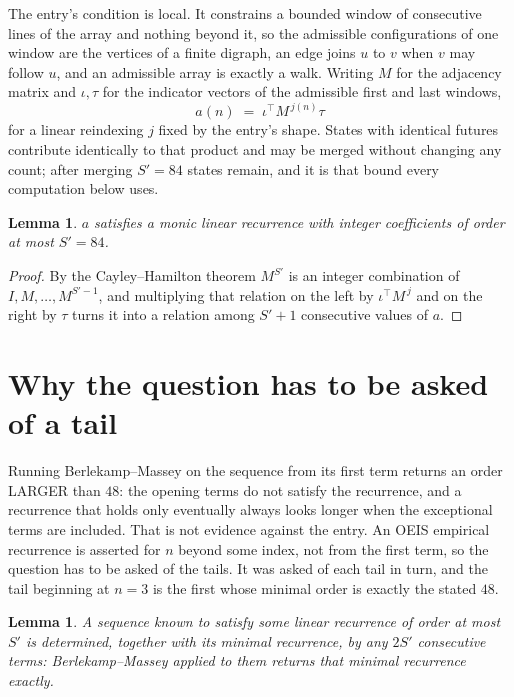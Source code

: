 \documentclass[11pt,a4paper]{article}
\theoremstyle{plain}
\newtheorem{lemma}[theorem]{Lemma}
\theoremstyle{definition}
\begin{document}
The entry's condition is local. It constrains a bounded window of consecutive lines of the
array and nothing beyond it, so the admissible configurations of one window are the vertices of
a finite digraph, an edge joins $u$ to $v$ when $v$ may follow $u$, and an admissible array is
exactly a walk. Writing $M$ for the adjacency matrix and $\iota,\tau$ for the indicator vectors
of the admissible first and last windows,
\[
a(n)\;=\;\iota^{\!\top}M^{\,j(n)}\tau
\]
for a linear reindexing $j$ fixed by the entry's shape. States with identical futures
contribute identically to that product and may be merged without changing any count; after
merging $S'=84$ states remain, and it is that bound every computation below uses.

\begin{lemma}\label{lem:cf}
$a$ satisfies a monic linear recurrence with integer coefficients of order at most $S'=84$.
\end{lemma}

\begin{proof}
By the Cayley--Hamilton theorem $M^{S'}$ is an integer combination of $I,M,\dots,M^{S'-1}$,
and multiplying that relation on the left by $\iota^{\!\top}M^{\,j}$ and on the right by
$\tau$ turns it into a relation among $S'+1$ consecutive values of $a$.
\end{proof}

\section{Why the question has to be asked of a tail}

Running Berlekamp--Massey on the sequence from its first term returns an order LARGER than $48$: the opening terms do not satisfy the recurrence, and a recurrence that holds only eventually always looks longer when the exceptional terms are included. That is not evidence against the entry. An OEIS empirical recurrence is asserted for $n$ beyond some index, not from the first term, so the question has to be asked of the tails. It was asked of each tail in turn, and the tail beginning at $n=3$ is the first whose minimal order is exactly the stated $48$.

\begin{lemma}\label{lem:bm}
A sequence known to satisfy some linear recurrence of order at most $S'$ is determined,
together with its minimal recurrence, by any $2S'$ consecutive terms: Berlekamp--Massey applied
to them returns that minimal recurrence exactly.
\end{lemma}
\end{document}
